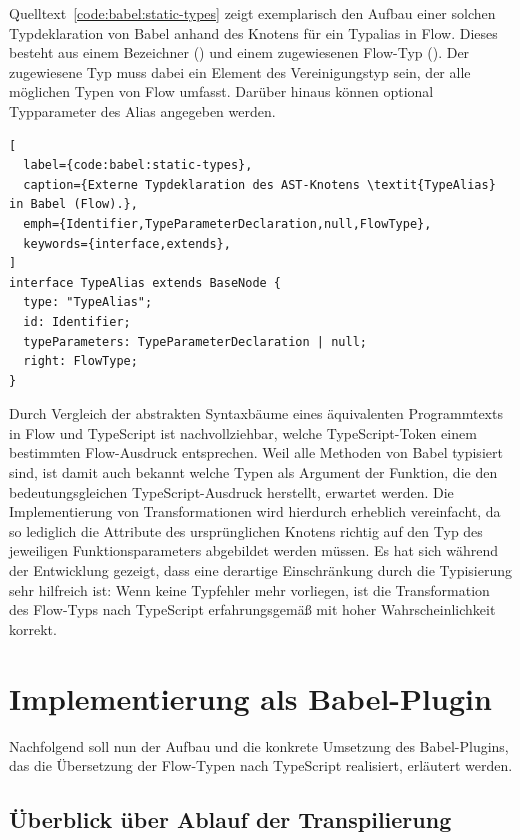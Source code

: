 Quelltext~\ref{code:babel:static-types} zeigt exemplarisch den Aufbau einer solchen Typdeklaration von Babel anhand des Knotens für ein Typalias in Flow. Dieses besteht aus einem Bezeichner () und einem zugewiesenen Flow-Typ (). Der zugewiesene Typ muss dabei ein Element des Vereinigungstyp  sein, der alle möglichen Typen von Flow umfasst. Darüber hinaus können optional Typparameter des Alias angegeben werden.

\begin{lstlisting}[
  label={code:babel:static-types},
  caption={Externe Typdeklaration des AST-Knotens \textit{TypeAlias} in Babel (Flow).},
  emph={Identifier,TypeParameterDeclaration,null,FlowType},
  keywords={interface,extends},
]
interface TypeAlias extends BaseNode {
  type: "TypeAlias";
  id: Identifier;
  typeParameters: TypeParameterDeclaration | null;
  right: FlowType;
}
\end{lstlisting}

Durch Vergleich der abstrakten Syntaxbäume eines äquivalenten Programmtexts in Flow und TypeScript ist nachvollziehbar, welche TypeScript-Token einem bestimmten Flow-Ausdruck entsprechen. Weil alle Methoden von Babel typisiert sind, ist damit auch bekannt welche Typen als Argument der Funktion, die den bedeutungsgleichen TypeScript-Ausdruck herstellt, erwartet werden. Die Implementierung von Transformationen wird hierdurch erheblich vereinfacht, da so lediglich die Attribute des ursprünglichen Knotens richtig auf den Typ des jeweiligen Funktionsparameters abgebildet werden müssen. Es hat sich während der Entwicklung gezeigt, dass eine derartige Einschränkung durch die Typisierung sehr hilfreich ist: Wenn keine Typfehler mehr vorliegen, ist die Transformation des Flow-Typs nach TypeScript erfahrungsgemäß mit hoher Wahrscheinlichkeit korrekt.

\section{Implementierung als Babel-Plugin}

Nachfolgend soll nun der Aufbau und die konkrete Umsetzung des Babel-Plugins, das die Übersetzung der Flow-Typen nach TypeScript realisiert, erläutert werden.

\subsection{Überblick über Ablauf der Transpilierung}

